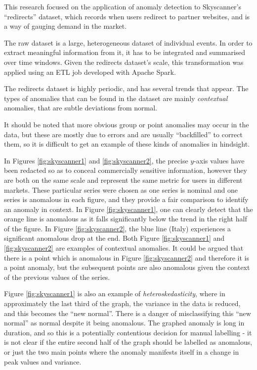 \documentclass{mpaper}
\begin{document}
This research focused on the application of anomaly detection to Skyscanner's ``redirects'' dataset, which records when users redirect to partner websites, and is a way of gauging demand in the market.

The raw dataset is a large, heterogeneous dataset of individual events. In order to extract meaningful information from it, it has to be integrated and summarised over time windows. Given the redirects dataset's scale, this transformation was applied using an ETL job developed with Apache Spark.

The redirects dataset is highly periodic, and has several trends that appear. The types of anomalies that can be found in the dataset are mainly \textit{contextual} anomalies, that are subtle deviations from normal.

It should be noted that more obvious group or point anomalies may occur in the data, but these are mostly due to errors and are usually ``backfilled'' to correct them, so it is difficult to get an example of these kinds of anomalies in hindsight. 

In Figures \ref{fig:skyscanner1} and \ref{fig:skyscanner2}, the precise $y$-axis values have been redacted so as to conceal commercially sensitive information, however they are both on the same scale and represent the same metric for users in different markets. These particular series were chosen as one series is nominal and one series is anomalous in each figure, and they provide a fair comparison to identify an anomaly in context. In Figure \ref{fig:skyscanner1}, one can clearly detect that the orange line is anomalous as it falls significantly below the trend in the right half of the figure. In Figure \ref{fig:skyscanner2}, the blue line (Italy) experiences a significant anomalous drop at the end. Both Figure \ref{fig:skyscanner1} and \ref{fig:skyscanner2} are examples of contextual anomalies. It could be argued that there is a point which is anomalous in Figure \ref{fig:skyscanner2} and therefore it is a point anomaly, but the subsequent points are also anomalous given the context of the previous values of the series.

Figure \ref{fig:skyscanner1} is also an example of \textit{heteroskedasticity}, where in approximately the last third of the graph, the variance in the data is reduced, and this becomes the ``new normal''. There is a danger of misclassifying this ``new normal'' as normal despite it being anomalous. The graphed anomaly is long in duration, and so this is a potentially contentious decision for manual labelling - it is not clear if the entire second half of the graph should be labelled as anomalous, or just the two main points where the anomaly manifests itself in a change in peak values and variance.
\end{document}
